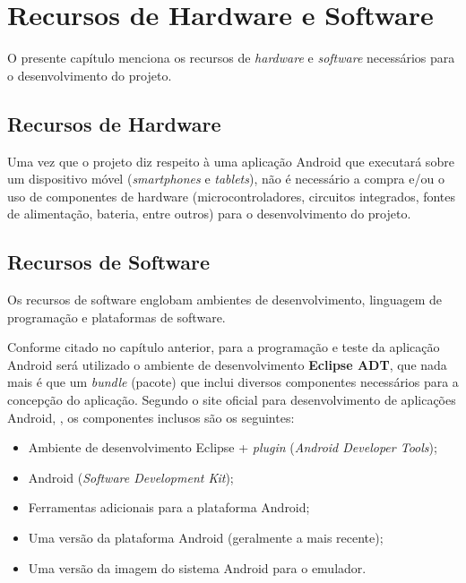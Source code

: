 \chapter{Recursos de Hardware e Software}\label{cap:recursos}

O presente capítulo menciona os recursos de \textit{hardware} e \textit{software} necessários para o desenvolvimento do projeto.

\section{Recursos de Hardware}\label{s:hardware}

Uma vez que o projeto diz respeito à uma aplicação Android que executará sobre um dispositivo móvel (\textit{smartphones} e \textit{tablets}), não é necessário a compra e/ou o uso de componentes de hardware (microcontroladores, circuitos integrados, fontes de alimentação, bateria, entre outros) para o desenvolvimento do projeto.


\section{Recursos de Software}\label{s:software}


Os recursos de software englobam ambientes de desenvolvimento, linguagem de programação e plataformas de software.

Conforme citado no capítulo anterior, para a programação e teste da aplicação Android será utilizado o ambiente de desenvolvimento \textbf{Eclipse ADT}, que nada mais é que um \textit{bundle} (pacote) que inclui diversos componentes necessários para a concepção do aplicação. Segundo o site oficial para desenvolvimento de aplicações Android, , os componentes inclusos são os seguintes:

\begin{itemize}
\item Ambiente de desenvolvimento Eclipse + \textit{plugin}  (\textit{Android Developer Tools});
\item Android  (\textit{Software Development Kit});
\item Ferramentas adicionais para a plataforma Android;
\item Uma versão da plataforma Android (geralmente a mais recente);
\item Uma versão da imagem do sistema Android para o emulador.
\end{itemize}


